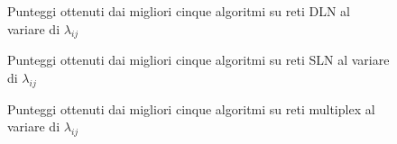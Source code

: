 

\begin{figure}
    
    \centering
    \resizebox{\textwidth}{!}{}
    
    \caption{Punteggi ottenuti dai migliori cinque algoritmi su reti DLN al variare di $\lambda_{ij}$}
    \label{chart:dlnij}
\end{figure}


\begin{figure}
    
    \centering
    \resizebox{\textwidth}{!}{}
    
    \caption{Punteggi ottenuti dai migliori cinque algoritmi su reti SLN al variare di $\lambda_{ij}$}
    \label{chart:slnij}
\end{figure}

\begin{figure}
    
    \centering
    \resizebox{\textwidth}{!}{}

    \caption{Punteggi ottenuti dai migliori cinque algoritmi su reti multiplex al variare di $\lambda_{ij}$}
    \label{chart:muxij}
\end{figure}